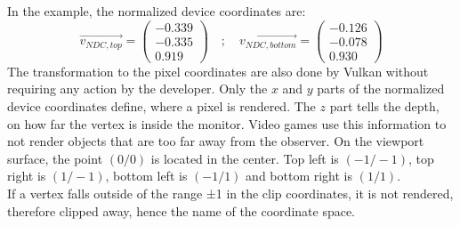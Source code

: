 In the example, the normalized device coordinates are: 
\begin{equation*}
    \vec{v_{NDC,top}} =     
    \begin{pmatrix}
        -0.339 \\
        -0.335 \\
        0.919
    \end{pmatrix} \quad ; \quad
    \vec{v_{NDC,bottom}} = 
    \begin{pmatrix}
        -0.126 \\
        -0.078 \\
        0.930
    \end{pmatrix}
\end{equation*}
The transformation to the pixel coordinates are also done by Vulkan without requiring any action by the developer. Only the $x$ and $y$ parts of the normalized device coordinates define, where a pixel is rendered. 
 The $z$ part tells the depth, on how far the vertex is inside the monitor. Video games use this information to not render objects that are too far away from the observer. On the viewport surface, the point $(0 / 0)$ is located in the center. Top left is $(-1 / -1)$, top right is $(1 / -1)$, bottom left is $(-1 / 1)$ and bottom right is $(1 / 1)$.\\
If a vertex falls outside of the range ±1 in the clip coordinates, it is not rendered, therefore clipped away, hence the name of the coordinate space.
\newpage
